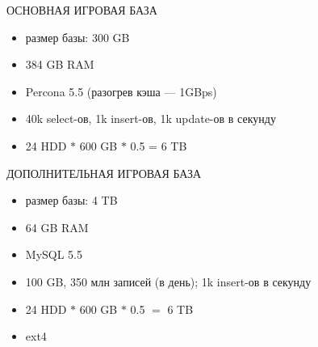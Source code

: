 \documentclass[aspectratio=169]{beamer}
\begin{document}
\begin{frame}{ОСНОВНАЯ ИГРОВАЯ БАЗА}
    \begin{itemize}
        \item размер базы: 300 GB
        \item 384 GB RAM
        \item Percona 5.5 (разогрев кэша --- 1GBps)
        \item 40k select-ов, 1k insert-ов, 1k update-ов в секунду
        \item 24 HDD $*$ 600 GB $*$ 0.5 = 6 TB
    \end{itemize}
\end{frame}

\begin{frame}{ДОПОЛНИТЕЛЬНАЯ ИГРОВАЯ БАЗА}
    \begin{itemize}
        \item размер базы: 4 TB
        \item 64 GB RAM
        \item MySQL 5.5
        \item 100 GB, 350 млн записей (в день); 1k insert-ов в секунду
        \item 24 HDD $*$ 600 GB $*$ 0.5 $=$ 6 TB
        \item ext4
    \end{itemize}
\end{frame}
\end{document}
